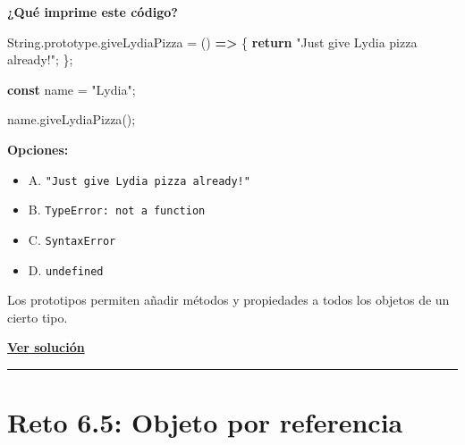 \documentclass[
  letterpaper,
  DIV=11,
  numbers=noendperiod]{scrreprt}
\newenvironment{Shaded}{\begin{snugshade}}{\end{snugshade}}
\newcommand{\AttributeTok}[1]{\textcolor[rgb]{0.40,0.45,0.13}{#1}}
\newcommand{\BuiltInTok}[1]{\textcolor[rgb]{0.00,0.23,0.31}{#1}}
\newcommand{\ControlFlowTok}[1]{\textcolor[rgb]{0.00,0.23,0.31}{\textbf{#1}}}
\newcommand{\FunctionTok}[1]{\textcolor[rgb]{0.28,0.35,0.67}{#1}}
\newcommand{\KeywordTok}[1]{\textcolor[rgb]{0.00,0.23,0.31}{\textbf{#1}}}
\newcommand{\NormalTok}[1]{\textcolor[rgb]{0.00,0.23,0.31}{#1}}
\newcommand{\OperatorTok}[1]{\textcolor[rgb]{0.37,0.37,0.37}{#1}}
\newcommand{\StringTok}[1]{\textcolor[rgb]{0.13,0.47,0.30}{#1}}
\providecommand{\tightlist}{%
  \setlength{\itemsep}{0pt}\setlength{\parskip}{0pt}}
\begin{document}
\textbf{¿Qué imprime este código?}

\begin{Shaded}
\begin{Highlighting}[]
\BuiltInTok{String}\OperatorTok{.}\AttributeTok{prototype}\OperatorTok{.}\AttributeTok{giveLydiaPizza} \OperatorTok{=}\NormalTok{ () }\KeywordTok{=\textgreater{}}\NormalTok{ \{}
  \ControlFlowTok{return} \StringTok{"Just give Lydia pizza already!"}\OperatorTok{;}
\NormalTok{\}}\OperatorTok{;}

\KeywordTok{const}\NormalTok{ name }\OperatorTok{=} \StringTok{"Lydia"}\OperatorTok{;}

\NormalTok{name}\OperatorTok{.}\FunctionTok{giveLydiaPizza}\NormalTok{()}\OperatorTok{;}
\end{Highlighting}
\end{Shaded}

\textbf{Opciones:}

\begin{itemize}
\tightlist
\item
  A. \texttt{"Just\ give\ Lydia\ pizza\ already!"}
\item
  B. \texttt{TypeError:\ not\ a\ function}
\item
  C. \texttt{SyntaxError}
\item
  D. \texttt{undefined}
\end{itemize}

\begin{tcolorbox}[enhanced jigsaw, left=2mm, toprule=.15mm, leftrule=.75mm, breakable, colback=white, coltitle=black, bottomtitle=1mm, arc=.35mm, rightrule=.15mm, colframe=quarto-callout-tip-color-frame, opacitybacktitle=0.6, toptitle=1mm, opacityback=0, titlerule=0mm, title=\textcolor{quarto-callout-tip-color}{\faLightbulb}\hspace{0.5em}{Pista}, bottomrule=.15mm, colbacktitle=quarto-callout-tip-color!10!white]

Los prototipos permiten añadir métodos y propiedades a todos los objetos
de un cierto tipo.

\end{tcolorbox}

\textbf{\hyperref[sec-sol-cap6-reto4]{Ver solución}}

\begin{center}\rule{0.5\linewidth}{0.5pt}\end{center}

\section{Reto 6.5: Objeto por referencia}\label{sec-cap6-reto5}
\end{document}
